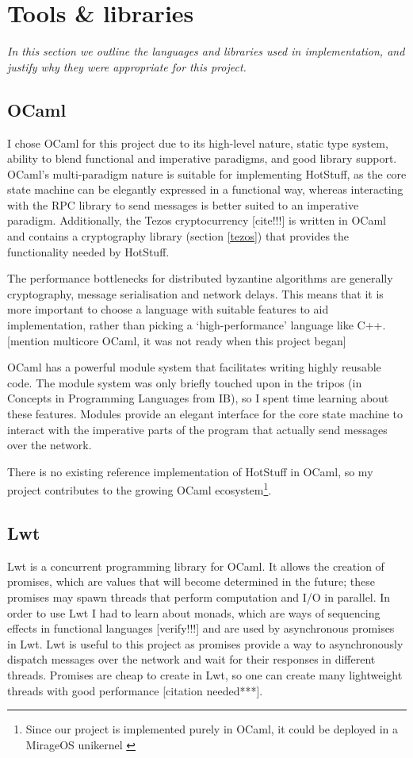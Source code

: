 \section{Tools \& libraries} \label{tools}
\textit{In this section we outline the languages and libraries used in implementation, and justify why they were appropriate for this project.}

\subsection{OCaml}
I chose OCaml \cite{noauthor_ocaml_nodate} for this project due to its high-level nature, static type system, ability to blend functional and imperative paradigms, and good library support. OCaml's multi-paradigm nature is suitable for implementing HotStuff, as the core state machine can be elegantly expressed in a functional way, whereas interacting with the RPC library to send messages is better suited to an imperative paradigm. Additionally, the Tezos cryptocurrency [cite!!!] is written in OCaml and contains a cryptography library (section \ref{tezos}) that provides the functionality needed by HotStuff.

The performance bottlenecks for distributed byzantine algorithms are generally cryptography, message serialisation and network delays. This means that it is more important to choose a language with suitable features to aid implementation, rather than picking a `high-performance' language like C++. [mention multicore OCaml, it was not ready when this project began]

OCaml has a powerful module system that facilitates writing highly reusable code. The module system was only briefly touched upon in the tripos (in Concepts in Programming Languages from IB), so I spent time learning about these features. Modules provide an elegant interface for the core state machine to interact with the imperative parts of the program that actually send messages over the network.

There is no existing reference implementation of HotStuff in OCaml, so my project contributes to the growing OCaml ecosystem\footnote{Since our project is implemented purely in OCaml, it could be deployed in a MirageOS unikernel \cite{noauthor_mirageos_nodate}}.

\subsection{Lwt}
Lwt \cite{noauthor_lwt_2023} is a concurrent programming library for OCaml. It allows the creation of promises, which are values that will become determined in the future; these promises may spawn threads that perform computation and I/O in parallel. In order to use Lwt I had to learn about monads, which are ways of sequencing effects in functional languages [verify!!!] and are used by asynchronous promises in Lwt. Lwt is useful to this project as promises provide a way to asynchronously dispatch messages over the network and wait for their responses in different threads. Promises are cheap to create in Lwt, so one can create many lightweight threads with good performance [citation needed***].

